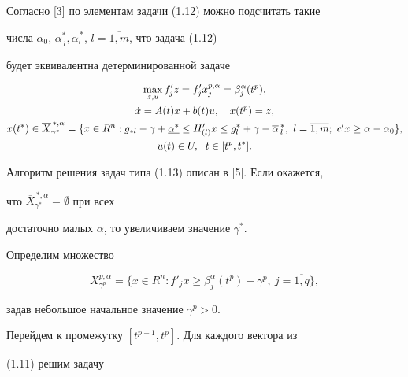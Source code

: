 Согласно [3] по элементам задачи (1.12) можно подсчитать такие


числа $\alpha_0$, $\underline{\alpha}_{\,l}^{*},


\overline{\alpha}^{\,*}_{l}$, $l=\overline{1,m}$, что задача (1.12)


будет эквивалентна детерминированной задаче


\begin{gather}


\max_{z,u}f'_{j}z=f'_{j}x_{j}^{p,\alpha}=\beta^{\alpha}_{j}(t^{p}),\notag\\


%


\Dot x =A(t)x+b(t)u,\quad x(t^p)=z, \\


%


x(t^*) \in \overline{X}_{\gamma^*}^{\,*,\alpha}=\{x \in


R^{n}:g_{*l}-\gamma+\underline{\alpha^*} \le H'_{(l)}x \le


g_l^{*}+\gamma-\overline{\alpha}\,^*_l,\ l=\overline{1,m};\ c'x \ge


\alpha-\alpha_0 \},\notag \\


%


u(t) \in U,\ \; t \in [t^p,t^*].\notag


\end{gather}





Алгоритм решения задач типа (1.13) описан в [5]. Если окажется,


что $\overline{X}_{\gamma^{*}}^{\,*,\alpha}=\emptyset$ при всех


достаточно малых $\alpha$, то увеличиваем значение $\gamma^*$.


Определим множество


$$


X^{p,\alpha}_{\gamma^p}=\{x \in R^{n}:f'_{j}x \ge


\beta^{\alpha}_{j}(t^p)-\gamma^{p},\ j =\overline{1,q}\},


$$


задав небольшое начальное значение $\gamma^{p}>0$.


Перейдем к промежутку $[t^{p-1}, t^{p}]$. Для каждого вектора из


(1.11) решим задачу


